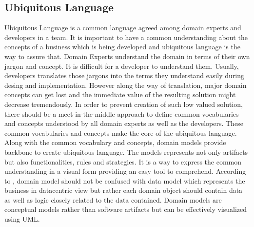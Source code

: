 \subsection{Ubiquitous Language}\label{section:domain_driven_design/process_to_domain_driven_design/ubiquitous_language}
Ubiquitous Language is a common language agreed among domain experts and developers in a team. It is important to have a common understanding about the concepts of a business which is being developed and ubiquitous language is the way to assure that. Domain Experts understand the domain in terms of their own jargon and concept. It is difficult for a developer to understand them. Usually, developers translates those jargons into the terms they understand easily during desing and implementation. However along the way of translation, major domain concepts can get lost and the immediate value of the resulting solution might decrease tremendously. In order to prevent creation of such low valued solution, there should be a meet-in-the-middle approach to define common vocabularies and concepts understood by all domain experts as well as the developers. These common vocabularies and concepts make the core of the ubiquitous language.\cite{Evans:2003aa}\cite{Vernon:2013aa}
\\
Along with the common vocabulary and concepts, domain models provide backbone to create ubiquitous language. The models represents not only artifacts but also functionalities, rules and strategies. It is a way to express the common understanding in a visual form providing an easy tool to comprehend.\cite{Evans:2003aa}\cite{Fowler:2006aa} According to \cite{Fowler:2003aa}, domain model should not be confused with data model which represents the business in datacentric view but rather each domain object should contain data as well as logic closely related to the data contained. Domain models are conceptual models rather than software artifacts but can be effectively visualized using \acrshort{UML}.\cite{Scott:2001aa}

